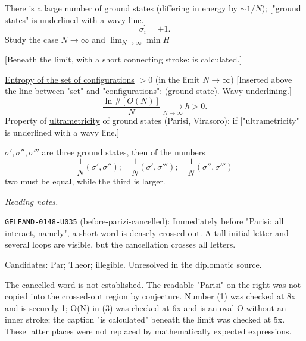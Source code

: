 There is a large number of \underline{ground states}
(differing in energy by $\sim1/N$);
["ground states" is underlined with a wavy line.]
\begin{equation*}
\sigma_i=\pm1.
\end{equation*}
Study the case $N\to\infty$ and $\displaystyle\lim_{N\to\infty}\min H$

[Beneath the limit, with a short connecting stroke: is calculated.]

\underline{Entropy of the set of configurations} $>0$ (in the limit $N\to\infty$)
[Inserted above the line between "set" and "configurations": (ground-state). Wavy underlining.]
\begin{equation*}
\frac{\ln\# [O(N)]}{N}\underset{N\to\infty}{\longrightarrow}h>0. \tag{3}
\end{equation*}
Property of \underline{ultrametricity} of ground states (Parisi, Virasoro): if
["ultrametricity" is underlined with a wavy line.]

$\sigma',\sigma'',\sigma'''$ are three ground states, then of the numbers
\begin{equation*}
\frac1N(\sigma',\sigma'');\quad
\frac1N(\sigma',\sigma''');\quad
\frac1N(\sigma'',\sigma''') \tag{4}
\end{equation*}
two must be equal, while the third is larger.

\par\smallskip\noindent\textit{Reading notes.}\par
\noindent\texttt{GELFAND-0148-U035} (before-parizi-cancelled): Immediately before "Parisi: all interact, namely", a short word is densely crossed out. A tall initial letter and several loops are visible, but the cancellation crosses all letters.\par
Candidates: Par; Theor; illegible. Unresolved in the diplomatic source.\par
The cancelled word is not established. The readable "Parisi" on the right was not copied into the crossed-out region by conjecture. Number (1) was checked at 8x and is securely 1; O(N) in (3) was checked at 6x and is an oval O without an inner stroke; the caption "is calculated" beneath the limit was checked at 5x. These latter places were not replaced by mathematically expected expressions.\par

